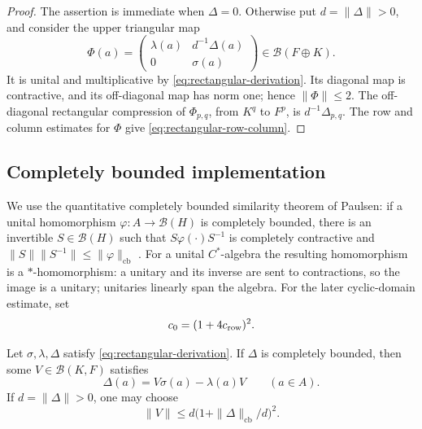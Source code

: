 \begin{proof}
The assertion is immediate when \(\Delta=0\). Otherwise put
\(d=\|\Delta\|>0\), and consider the upper triangular map
\begin{equation}
 \Phi(a)=
 \begin{pmatrix}
  \lambda(a)&d^{-1}\Delta(a)\\
  0&\sigma(a)
 \end{pmatrix}
 \in\mathcal B(F\oplus K).
 \label{eq:triangular-homomorphism}
\end{equation}
It is unital and multiplicative by \eqref{eq:rectangular-derivation}.
Its diagonal map is contractive, and its off-diagonal map has norm one;
hence \(\|\Phi\|\le2\). The off-diagonal rectangular compression of
\(\Phi_{p,q}\), from \(K^q\) to \(F^p\), is
\(d^{-1}\Delta_{p,q}\). The row and column estimates for \(\Phi\)
give \eqref{eq:rectangular-row-column}.
\end{proof}

\subsection{Completely bounded implementation}

We use the quantitative completely bounded similarity theorem of
Paulsen: if a unital homomorphism \(\varphi:A\to\mathcal B(H)\) is
completely bounded, there is an invertible \(S\in\mathcal B(H)\) such
that \(S\varphi(\cdot)S^{-1}\) is completely contractive and
\(\|S\|\|S^{-1}\|\le\|\varphi\|_{\mathrm{cb}}\)
\citep[p.~226]{Paulsen1984}. For a unital \(C^*\)-algebra the
resulting homomorphism is a \(*\)-homomorphism: a unitary and its inverse
are sent to contractions, so the image is a unitary; unitaries linearly
span the algebra. For the later cyclic-domain estimate, set
\begin{equation}
 c_0=(1+4c_{\rm row})^2.
 \label{eq:cyclic-constant}
\end{equation}

\begin{lemma}
\label{lem:cb-implementation}
Let \(\sigma,\lambda,\Delta\) satisfy
\eqref{eq:rectangular-derivation}. If \(\Delta\) is completely bounded,
then some \(V\in\mathcal B(K,F)\) satisfies
\begin{equation}
 \Delta(a)=V\sigma(a)-\lambda(a)V\qquad(a\in A).
 \label{eq:rectangular-implementation}
\end{equation}
If \(d=\|\Delta\|>0\), one may choose
\[
 \|V\|\le d\bigl(1+\|\Delta\|_{\mathrm{cb}}/d\bigr)^2.
\]
\end{lemma}

